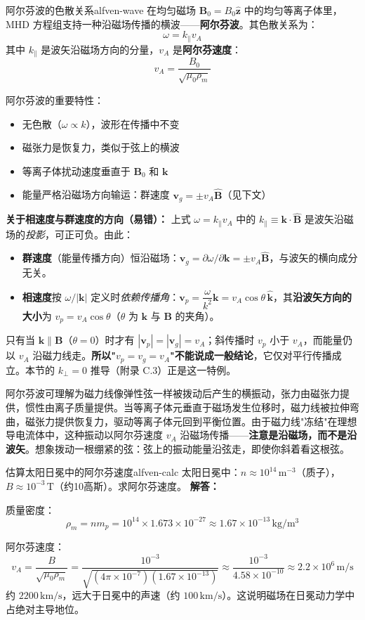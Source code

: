 \documentclass[12pt,a4paper,openany,oneside]{book}
\newcommand{\vect}[1]{\bm{#1}}
\newcommand{\unitvec}[1]{\hat{\vect{#1}}}
\newcommand{\difficulty}[1]{\marginnote{\hfill\textcolor{coverMid!80}{\rule[-0.1em]{2pt}{0.9em}}\,\textcolor{coverMid}{\footnotesize\textbf{[#1]}}}}
\begin{document}
\begin{theorem}{阿尔芬波的色散关系}{alfven-wave}
在均匀磁场 $\vect{B}_0 = B_0\unitvec{z}$ 中的均匀等离子体里，MHD 方程组支持一种沿磁场传播的横波——\textbf{阿尔芬波}。其色散关系为：
\[
\omega = k_\parallel v_A
\]
其中 $k_\parallel$ 是波矢沿磁场方向的分量，$v_A$ 是\textbf{阿尔芬速度}：
\[
v_A = \frac{B_0}{\sqrt{\mu_0\rho_m}}
\]

阿尔芬波的重要特性：
\begin{itemize}
\item 无色散（$\omega \propto k$），波形在传播中不变
\item 磁张力是恢复力，类似于弦上的横波
\item 等离子体扰动速度垂直于 $\vect{B}_0$ 和 $\vect{k}$
\item 能量严格沿磁场方向输运：群速度 $\vect{v}_g = \pm v_A\unitvec{B}$（见下文）
\end{itemize}

\textbf{关于相速度与群速度的方向（易错）：} 上式 $\omega=k_\parallel v_A$ 中的 $k_\parallel\equiv\vect{k}\cdot\unitvec{B}$ 是波矢沿磁场的\emph{投影}，可正可负。由此：
\begin{itemize}
\item \textbf{群速度}（能量传播方向）恒沿磁场：$\vect{v}_g = \partial\omega/\partial\vect{k} = \pm v_A\unitvec{B}$，与波矢的横向成分无关。
\item \textbf{相速度}按 $\omega/|\vect{k}|$ 定义时\emph{依赖传播角}：$\vect{v}_p = \dfrac{\omega}{k^2}\vect{k} = v_A\cos\theta\,\unitvec{k}$，其\textbf{沿波矢方向的大小}为 $v_p = v_A\cos\theta$（$\theta$ 为 $\vect{k}$ 与 $\vect{B}$ 的夹角）。
\end{itemize}
只有当 $\vect{k}\parallel\vect{B}$（$\theta=0$）时才有 $|\vect{v}_p|=|\vect{v}_g|=v_A$；斜传播时 $v_p$ 小于 $v_A$，而能量仍以 $v_A$ 沿磁力线走。\textbf{所以"$v_p=v_g=v_A$"不能说成一般结论}，它仅对平行传播成立。本节的 $k_\perp=0$ 推导（附录 C.3）正是这一特例。
\end{theorem}

阿尔芬波可理解为磁力线像弹性弦一样被拨动后产生的横振动，张力由磁张力提供，惯性由离子质量提供。当等离子体元垂直于磁场发生位移时，磁力线被拉伸弯曲，磁张力提供恢复力，驱动等离子体元回到平衡位置。由于磁力线"冻结"在理想导电流体中，这种振动以阿尔芬速度 $v_A$ 沿磁场传播——\textbf{注意是沿磁场，而不是沿波矢}。想象拨动一根绷紧的弦：弦上的振动能量沿弦走，即使你斜着看这根弦。

\begin{example}{估算太阳日冕中的阿尔芬速度}{alfven-calc}
\difficulty{基础}
太阳日冕中：$n \approx 10^{14}\,\mathrm{m}^{-3}$（质子），$B \approx 10^{-3}\,\mathrm{T}$（约10高斯）。求阿尔芬速度。
\tcblower
\textbf{解答：}

质量密度：
\[
\rho_m = n m_p = 10^{14} \times 1.673\times 10^{-27} \approx 1.67\times 10^{-13}\,\mathrm{kg/m^3}
\]

阿尔芬速度：
\[
v_A = \frac{B}{\sqrt{\mu_0\rho_m}} = \frac{10^{-3}}{\sqrt{(4\pi\times 10^{-7})(1.67\times 10^{-13})}} \approx \frac{10^{-3}}{4.58\times 10^{-10}} \approx 2.2\times 10^{6}\,\mathrm{m/s}
\]
约 $2200\,\mathrm{km/s}$，远大于日冕中的声速（约 $100\,\mathrm{km/s}$）。这说明磁场在日冕动力学中占绝对主导地位。
\end{example}
\end{document}
